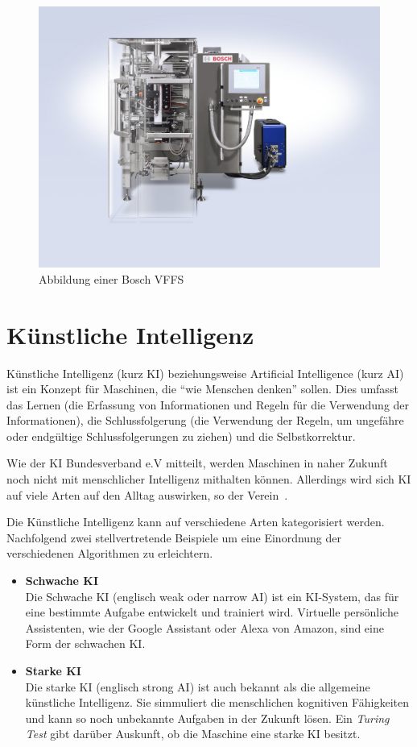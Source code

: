 \begin{figure}[h]
    \centering
    \includegraphics[scale=0.2]{images/kapitel_2/bosch_vffs.jpg}
    \caption{Abbildung einer Bosch VFFS}
    \label{fig:grundlagen_boschvffs}
\end{figure}

\section{Künstliche Intelligenz}
Künstliche Intelligenz (kurz KI) beziehungsweise Artificial Intelligence (kurz AI) ist ein Konzept für Maschinen, die
\enquote{wie Menschen denken} sollen. Dies umfasst das Lernen (die Erfassung von Informationen und Regeln für die
Verwendung der Informationen), die Schlussfolgerung (die Verwendung der Regeln, um ungefähre oder endgültige
Schlussfolgerungen zu ziehen) und die Selbstkorrektur.

Wie der KI Bundesverband e.V mitteilt, werden Maschinen in naher Zukunft noch nicht mit menschlicher Intelligenz
mithalten können. Allerdings wird sich KI auf viele Arten auf den Alltag auswirken, so der
Verein~\cite{article_grundlagen_ki}.

Die Künstliche Intelligenz kann auf verschiedene Arten kategorisiert werden. Nachfolgend zwei stellvertretende Beispiele
um eine Einordnung der verschiedenen Algorithmen zu erleichtern.

\begin{itemize}
    \item \textbf{Schwache KI} \\
    Die Schwache KI (englisch weak oder narrow AI) ist ein KI-System, das für eine bestimmte Aufgabe entwickelt und
    trainiert wird. Virtuelle persönliche Assistenten, wie der Google Assistant oder Alexa von Amazon, sind eine Form
    der schwachen KI.
    \item \textbf{Starke KI} \\
    Die starke KI (englisch strong AI) ist auch bekannt als die allgemeine künstliche Intelligenz. Sie simmuliert die
    menschlichen kognitiven Fähigkeiten und kann so noch unbekannte Aufgaben in der Zukunft lösen. Ein
    \textit{Turing Test} gibt darüber Auskunft, ob die Maschine eine starke KI besitzt.
\end{itemize}

